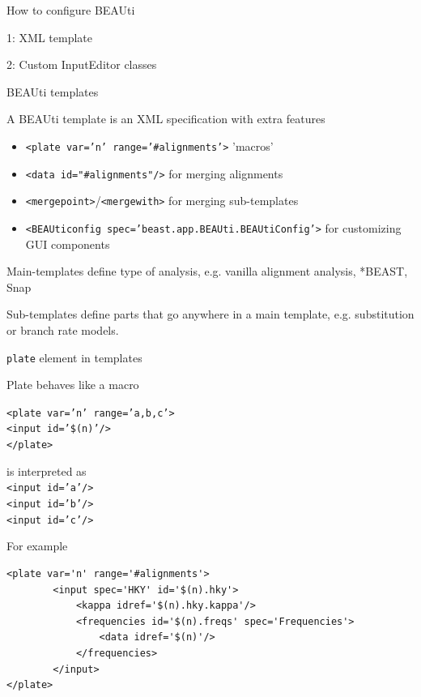 \documentclass{beamer}
\theoremstyle{definition}
\begin{document}
\begin{frame}[containsverbatim]{How to configure BEAUti}

1: XML template\vskip1cm

2: Custom InputEditor classes
\end{frame}


\begin{frame}[containsverbatim]{BEAUti templates}

A BEAUti template is an XML specification with extra features
\begin{itemize}
\item {\tt <plate var='n' range='#alignments'>} 'macros'
\item {\tt <data id="#alignments"/>} for merging alignments
\item {\tt <mergepoint>}/{\tt <mergewith>} for merging sub-templates
\item {\tt <BEAUticonfig spec='beast.app.BEAUti.BEAUtiConfig'>} for customizing GUI components
\end{itemize}\vskip0.5cm


Main-templates define type of analysis, e.g. vanilla alignment analysis, *BEAST, Snap\vskip0.5cm

Sub-templates define parts that go anywhere in a main template, e.g. substitution or branch rate models.


\end{frame}


\begin{frame}[containsverbatim]{{\tt plate} element in templates}

Plate behaves like a macro

{\tt<plate var='n' range='a,b,c'>\\
 <input id='\$(n)'/>\\
</plate>}

is interpreted as\\
{\tt<input id='a'/>\\
<input id='b'/>\\
<input id='c'/>\\
}
\vskip0.5cm

For example{\small

\begin{verbatim}<plate var='n' range='#alignments'>
        <input spec='HKY' id='$(n).hky'>
            <kappa idref='$(n).hky.kappa'/>
            <frequencies id='$(n).freqs' spec='Frequencies'>
                <data idref='$(n)'/>
            </frequencies>
        </input>
</plate>\end{verbatim}
}

\end{frame}
\end{document}
